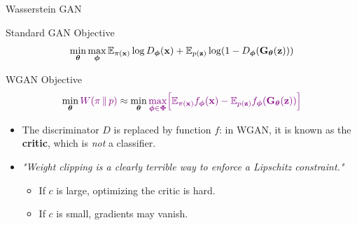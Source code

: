 \documentclass{beamer}
\begin{document}
\begin{frame}{Wasserstein GAN}
	\begin{block}{Standard GAN Objective}
		\vspace{-0.2cm}
		\[
		\min_{\boldsymbol{\theta}} \max_{\boldsymbol{\phi}} \mathbb{E}_{\pi(\mathbf{x})} \log D_{\boldsymbol{\phi}}(\mathbf{x}) + \mathbb{E}_{p(\mathbf{z})} \log (1 - D_{\boldsymbol{\phi}}(\mathbf{G}_{\boldsymbol{\theta}}(\mathbf{z})))
		\]
		\vspace{-0.3cm}
	\end{block}
	\begin{block}{WGAN Objective}
		\vspace{-0.3cm}
		\[
		\min_{\boldsymbol{\theta}} {\color{violet}W(\pi\,\|\,p)} \approx \min_{\boldsymbol{\theta}} {\color{violet}\max_{\boldsymbol{\phi} \in \boldsymbol{\Phi}} \Bigl[ \mathbb{E}_{\pi(\mathbf{x})} f_{\boldsymbol{\phi}}(\mathbf{x})  - \mathbb{E}_{p(\mathbf{z})} f_{\boldsymbol{\phi}}(\mathbf{G}_{\boldsymbol{\theta}}(\mathbf{z}))\Bigr]}
		\]
		\vspace{-0.3cm}
	\end{block}
	\begin{itemize}
		\item The discriminator $D$ is replaced by function $f$: in WGAN, it is known as the \textbf{critic}, which is \emph{not} a classifier.
		\item \textit{"Weight clipping is a clearly terrible way to enforce a Lipschitz constraint."}
		\begin{itemize}
			\item If $c$ is large, optimizing the critic is hard.
			\item If $c$ is small, gradients may vanish.
		\end{itemize}
	\end{itemize}	
\end{frame}
\end{document}
